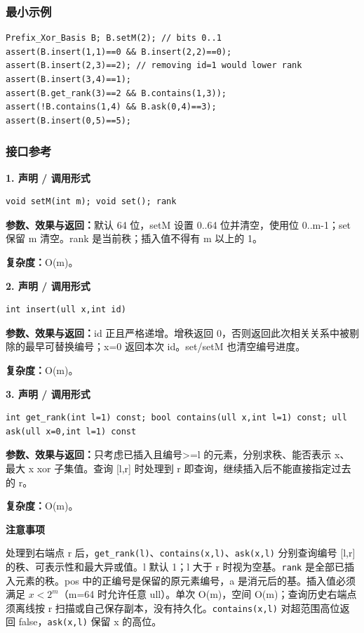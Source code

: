 \documentclass[UTF8,a4paper,10pt]{ctexart}
\newcommand{\TemplNote}[1]{\textbf{注意事项}\par #1\par}
\begin{document}
\subsubsection*{最小示例}
\begin{lstlisting}
Prefix_Xor_Basis B; B.setM(2); // bits 0..1
assert(B.insert(1,1)==0 && B.insert(2,2)==0);
assert(B.insert(2,3)==2); // removing id=1 would lower rank
assert(B.insert(3,4)==1);
assert(B.get_rank(3)==2 && B.contains(1,3));
assert(!B.contains(1,4) && B.ask(0,4)==3);
assert(B.insert(0,5)==5);
\end{lstlisting}
\subsubsection*{接口参考}
\noindent\begin{minipage}{\textwidth}
\textbf{1. 声明 / 调用形式}
\begin{lstlisting}
void setM(int m); void set(); rank
\end{lstlisting}
\textbf{参数、效果与返回：}默认 64 位，setM 设置 0..64 位并清空，使用位 0..m-1；set 保留 m 清空。rank 是当前秩；插入值不得有 m 以上的 1。

\textbf{复杂度：}O(m)。

\end{minipage}\par\vspace{0.4em}
\noindent\begin{minipage}{\textwidth}
\textbf{2. 声明 / 调用形式}
\begin{lstlisting}
int insert(ull x,int id)
\end{lstlisting}
\textbf{参数、效果与返回：}id 正且严格递增。增秩返回 0，否则返回此次相关关系中被剔除的最早可替换编号；x=0 返回本次 id。set/setM 也清空编号进度。

\textbf{复杂度：}O(m)。

\end{minipage}\par\vspace{0.4em}
\noindent\begin{minipage}{\textwidth}
\textbf{3. 声明 / 调用形式}
\begin{lstlisting}
int get_rank(int l=1) const; bool contains(ull x,int l=1) const; ull ask(ull x=0,int l=1) const
\end{lstlisting}
\textbf{参数、效果与返回：}只考虑已插入且编号>=l 的元素，分别求秩、能否表示 x、最大 x xor 子集值。查询 [l,r] 时处理到 r 即查询，继续插入后不能直接指定过去的 r。

\textbf{复杂度：}O(m)。

\TemplNote{处理到右端点 r 后，\texttt{get\_rank(l)}、\texttt{contains(x,l)}、\texttt{ask(x,l)} 分别查询编号 [l,r] 的秩、可表示性和最大异或值。l 默认 1；l 大于 r 时视为空基。\texttt{rank} 是全部已插入元素的秩。pos 中的正编号是保留的原元素编号，a 是消元后的基。插入值必须满足 $x<2^m$（m=64 时允许任意 ull）。单次 O(m)，空间 O(m)；查询历史右端点须离线按 r 扫描或自己保存副本，没有持久化。\texttt{contains(x,l)} 对超范围高位返回 false，\texttt{ask(x,l)} 保留 x 的高位。}
\end{minipage}\par\vspace{0.4em}
\clearpage
\end{document}
